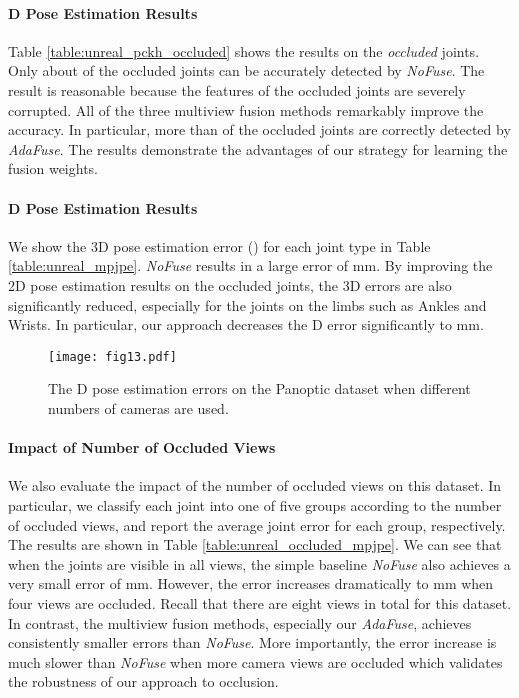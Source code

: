 \paragraph{D Pose Estimation Results}
Table \ref{table:unreal_pckh_occluded} shows the results on the \emph{occluded} joints. Only about  of the occluded joints can be accurately detected by \emph{NoFuse}. The result is reasonable because the features of the occluded joints are severely corrupted. All of the three multiview fusion methods remarkably improve the accuracy. In particular, more than  of the occluded joints are correctly detected by \emph{AdaFuse}. The results demonstrate the advantages of our strategy for learning the fusion weights.

\paragraph{D Pose Estimation Results}
We show the 3D pose estimation error () for each joint type in Table \ref{table:unreal_mpjpe}. \emph{NoFuse} results in a large error of mm. By improving the 2D pose estimation results on the occluded joints, the 3D errors are also significantly reduced, especially for the joints on the limbs such as Ankles and Wrists. In particular, our approach decreases the D error significantly to mm. 

\begin{figure}[]
    \centering
    \texttt{[image: fig13.pdf]}
    \caption{The D pose estimation errors on the Panoptic dataset when different numbers of cameras are used. }
    \label{fig:popt_nview_avg}
\end{figure}

\paragraph{Impact of Number of Occluded Views}
We also evaluate the impact of the number of occluded views on this dataset. In particular, we classify each joint into one of five groups according to the number of occluded views, and report the average joint error for each group, respectively. The results are shown in Table \ref{table:unreal_occluded_mpjpe}. We can see that when the joints are visible in all views, the simple baseline \emph{NoFuse} also achieves a very small error of mm. However, the error increases dramatically to mm when four views are occluded. Recall that there are eight views in total for this dataset. In contrast, the multiview fusion methods, especially our \emph{AdaFuse}, achieves consistently smaller errors than \emph{NoFuse}. More importantly, the error increase is much slower than \emph{NoFuse} when more camera views are occluded which validates the robustness of our approach to occlusion. 





